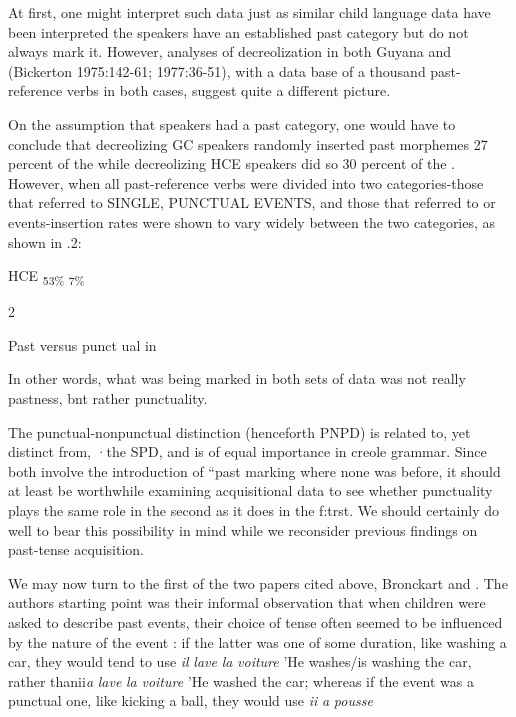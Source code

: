 At first, one might interpret such data just as similar child language data have been interpreted the speakers have an established past category but do not always mark it. However, analyses of de\-creolization in both Guyana and  (Bickerton 1975:142-61; 1977:36-51), with a data base of a thousand past-reference verbs in both cases, suggest quite a different picture.

On the assumption that speakers had a past category, one would have to conclude that decreolizing GC speakers randomly inserted past morphemes 27 percent of the  while decreolizing HCE speak\-ers did so 30 percent of the . However, when all past-reference verbs were divided into two categories-those that referred to SINGLE, PUNCTUAL EVENTS, and those that referred to  or  events-insertion rates were shown to vary widely between the two categories, as shown in .2:



HCE \textsubscript{53\% }\textsubscript{7\%}

\begin{table}
\caption{2}
\label{tab:3}
\end{table}

Past versus punct ual in 

In other words, what was being marked in both sets of data was not really pastness, bnt rather punctuality.

The punctual-nonpunctual distinction (henceforth PNPD) is related to, yet distinct from, ·the SPD, and is of equal importance in creole grammar. Since both   involve the introduction of ``past marking where none was before, it should at least be worthwhile examining acquisitional data to see whether punctuality plays the same role in the second as it does in the f:trst. We should certainly do well to bear this possibility in mind while we reconsider previous findings on past-tense acquisition.

We may now turn to the first of the two papers cited above, Bronckart and \citet{Sinclair1973}. The authors starting point was their informal observation that when children were asked to describe past events, their choice of tense often seemed to be influenced by the nature of the event : if the latter was one of some duration, like washing a car, they would tend to use \textit{il} \textit{lave} \textit{la} \textit{voiture} 'He washes/is washing the car, rather thanii\textit{a} \textit{lave} \textit{la} \textit{voiture }'He washed the car; whereas if the
event was a punctual one, like kicking a ball, they would use \textit{ii} \textit{a} \textit{pousse}

